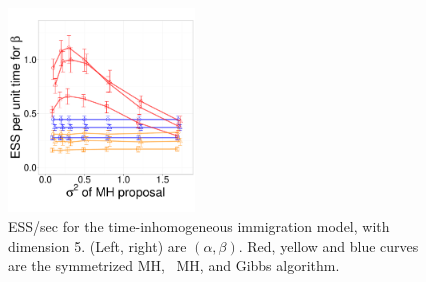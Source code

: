\begin{figure}[H]
\begin{minipage}[!hp]{0.65\linewidth}
    \includegraphics [width=0.44\textwidth, angle=0]{figs/pc_5_beta.pdf}
  \end{minipage}
  \begin{minipage}[!hp]{0.33\linewidth}
    \caption{ESS/sec for the time-inhomogeneous immigration model, with 
      dimension 5. (Left, right) are $(\alpha, \beta)$. Red, yellow and blue curves are the symmetrized MH,
  \naive\ MH, and Gibbs algorithm.}
     \label{fig:ESS_pc_5}
  \end{minipage}
  \end{figure}
